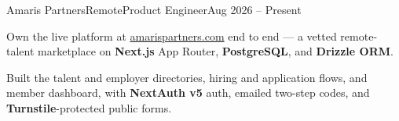 \begin{cvjob}{Amaris Partners}{Remote}{Product Engineer}{Aug 2026 -- Present}
  \item Own the live platform at \href{https://amarispartners.com}{amarispartners.com} end to end --- a vetted remote-talent marketplace on \textbf{Next.js} App Router, \textbf{PostgreSQL}, and \textbf{Drizzle ORM}.
  \item Built the talent and employer directories, hiring and application flows, and member dashboard, with \textbf{NextAuth v5} auth, emailed two-step codes, and \textbf{Turnstile}-protected public forms.
\end{cvjob}
